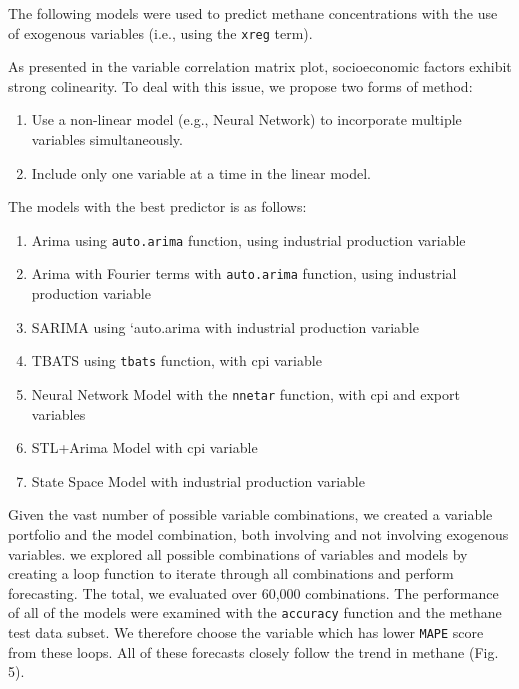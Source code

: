 \documentclass[
]{article}
\providecommand{\tightlist}{%
  \setlength{\itemsep}{0pt}\setlength{\parskip}{0pt}}
\begin{document}
The following models were used to predict methane concentrations with
the use of exogenous variables (i.e., using the \texttt{xreg} term).

As presented in the variable correlation matrix plot, socioeconomic
factors exhibit strong colinearity. To deal with this issue, we propose
two forms of method:

\begin{enumerate}
\def\labelenumi{\alph{enumi})}
\tightlist
\item
  Use a non-linear model (e.g., Neural Network) to incorporate multiple
  variables simultaneously.
\item
  Include only one variable at a time in the linear model.
\end{enumerate}

The models with the best predictor is as follows:

\begin{enumerate}
\def\labelenumi{\arabic{enumi}.}
\tightlist
\item
  Arima using \texttt{auto.arima} function, using industrial production
  variable
\item
  Arima with Fourier terms with \texttt{auto.arima} function, using
  industrial production variable
\item
  SARIMA using `auto.arima with industrial production variable
\item
  TBATS using \texttt{tbats} function, with cpi variable
\item
  Neural Network Model with the \texttt{nnetar} function, with cpi and
  export variables
\item
  STL+Arima Model with cpi variable
\item
  State Space Model with industrial production variable
\end{enumerate}

Given the vast number of possible variable combinations, we created a
variable portfolio and the model combination, both involving and not
involving exogenous variables. we explored all possible combinations of
variables and models by creating a loop function to iterate through all
combinations and perform forecasting. The total, we evaluated over
60,000 combinations. The performance of all of the models were examined
with the \texttt{accuracy} function and the methane test data subset. We
therefore choose the variable which has lower \texttt{MAPE} score from
these loops. All of these forecasts closely follow the trend in methane
(Fig. 5).
\end{document}
